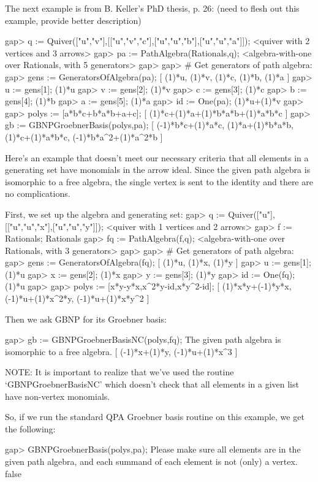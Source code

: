 
The next example is from B. Keller's PhD thesis, p. 26:
(need to flesh out this example, provide better description)

\beginexample
gap> q := Quiver(["u","v"],[["u","v","c"],["u","u","b"],["u","u","a"]]);
<quiver with 2 vertices and 3 arrows>
gap> pa := PathAlgebra(Rationals,q);
<algebra-with-one over Rationals, with 5 generators>
gap> 
gap> # Get generators of path algebra:
gap> gens := GeneratorsOfAlgebra(pa);
[ (1)*u, (1)*v, (1)*c, (1)*b, (1)*a ]
gap> u := gens[1];
(1)*u
gap> v := gens[2];
(1)*v
gap> c := gens[3];
(1)*c
gap> b := gens[4];
(1)*b
gap> a := gens[5];
(1)*a
gap> id := One(pa);
(1)*u+(1)*v
gap> 
gap> polys := [a*b*c+b*a*b+a+c];
[ (1)*c+(1)*a+(1)*b*a*b+(1)*a*b*c ]
gap> gb := GBNPGroebnerBasis(polys,pa);
[ (-1)*b*c+(1)*a*c, (1)*a+(1)*b*a*b, (1)*c+(1)*a*b*c, (-1)*b*a^2+(1)*a^2*b ]
\endexample



Here's an example that doesn't meet our necessary criteria
that all elements in a generating set have monomials in the
arrow ideal.  Since the given path algebra is isomorphic to a free algebra,
the single vertex is sent to the identity and there are
no complications.

First, we set up the algebra and generating set:
\beginexample
gap> q := Quiver(["u"],[["u","u","x"],["u","u","y"]]);
<quiver with 1 vertices and 2 arrows>
gap> f := Rationals;
Rationals
gap> fq := PathAlgebra(f,q);
<algebra-with-one over Rationals, with 3 generators>
gap> 
gap> # Get generators of path algebra:
gap> gens := GeneratorsOfAlgebra(fq);
[ (1)*u, (1)*x, (1)*y ]
gap> u := gens[1];
(1)*u
gap> x := gens[2];
(1)*x
gap> y := gens[3]; 
(1)*y
gap> id := One(fq);
(1)*u
gap> 
gap> polys := [x*y-y*x,x^2*y-id,x*y^2-id];
[ (1)*x*y+(-1)*y*x, (-1)*u+(1)*x^2*y, (-1)*u+(1)*x*y^2 ]
\endexample

Then we ask GBNP for its Groebner basis:

\beginexample
gap> gb := GBNPGroebnerBasisNC(polys,fq);
The given path algebra is isomorphic to a free algebra.
[ (-1)*x+(1)*y, (-1)*u+(1)*x^3 ]
\endexample

NOTE: It is important to realize that we've used the routine
`GBNPGroebnerBasisNC' which doesn't check that all elements in a
given list have non-vertex monomials.

So, if we run the standard QPA Groebner basis routine on this example,
we get the following:

\beginexample
gap> GBNPGroebnerBasis(polys,pa);
Please make sure all elements are in the given path algebra, 
and each summand of each element is not (only) a vertex.
false
\endexample

